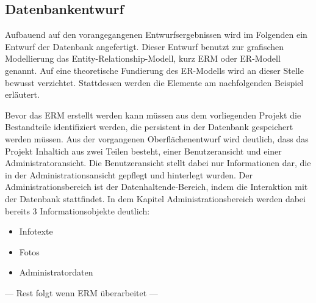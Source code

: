 \subsection{Datenbankentwurf}
\label{sec:Datenbankentwurf}

Aufbauend auf den vorangegangenen Entwurfsergebnissen wird im Folgenden ein Entwurf der Datenbank angefertigt. Dieser Entwurf benutzt zur grafischen Modellierung das Entity-Relationship-Modell\footnotemark, kurz ERM oder ER-Modell genannt. Auf eine theoretische Fundierung des ER-Modells wird an dieser Stelle bewusst verzichtet. Stattdessen werden die Elemente am nachfolgenden Beispiel erläutert.


Bevor das ERM erstellt werden kann müssen aus dem vorliegenden Projekt die Bestandteile identifiziert werden, die persistent in der Datenbank gespeichert werden müssen.
Aus der vorgangenen Oberflächenentwurf wird deutlich, dass das Projekt Inhaltich aus zwei Teilen besteht, einer Benutzeransicht und einer Administratoransicht. Die Benutzeransicht stellt dabei nur Informationen dar, die in der Administrationsansicht gepflegt und hinterlegt wurden. Der Administrationsbereich ist der Datenhaltende-Bereich, indem die Interaktion mit der Datenbank stattfindet. In dem Kapitel Administrationsbereich werden dabei bereits 3 Informationsobjekte deutlich:

\begin{itemize}
  \item Infotexte
  \item Fotos
  \item Administratordaten
\end{itemize}

--- Rest folgt wenn ERM überarbeitet ---